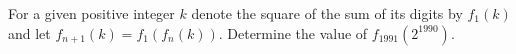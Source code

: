 For a given positive integer $k$ denote the square of the sum of its digits by $f_1(k)$ and let $f_{n+1}(k) = f_1(f_n(k))$. Determine the value of $f_{1991}(2^{1990})$.
